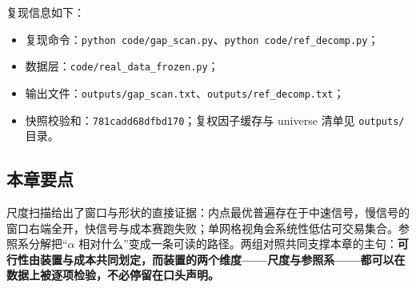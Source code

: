 复现信息如下：
\begin{itemize}
  \item 复现命令：\texttt{python code/\allowbreak gap\_scan.py}、\texttt{python code/\allowbreak ref\_decomp.py}；
  \item 数据层：\texttt{code/\allowbreak real\_data\_frozen.py}；
  \item 输出文件：\texttt{outputs/\allowbreak gap\_scan.txt}、\texttt{outputs/\allowbreak ref\_decomp.txt}；
  \item 快照校验和：\texttt{781cadd68dfbd170}；复权因子缓存与 universe 清单见 \texttt{outputs/} 目录。
\end{itemize}

\subsection{本章要点}

尺度扫描给出了窗口与形状的直接证据：内点最优普遍存在于中速信号，慢信号的窗口右端全开，快信号与成本赛跑失败；单网格视角会系统性低估可交易集合。参照系分解把“$\alpha$ 相对什么”变成一条可读的路径。两组对照共同支撑本章的主句：\textbf{可行性由装置与成本共同划定，而装置的两个维度——尺度与参照系——都可以在数据上被逐项检验，不必停留在口头声明。}